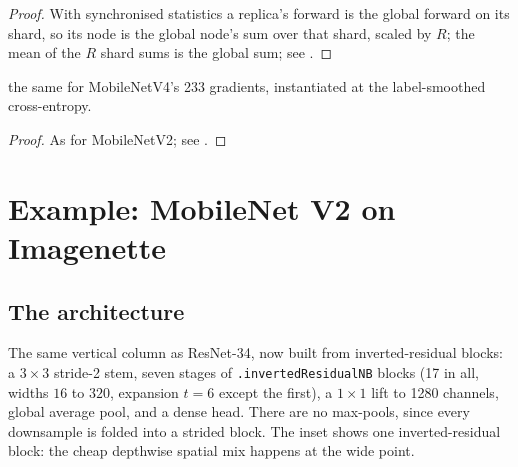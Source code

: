 \begin{proof}
\leanok
With synchronised statistics a replica's forward is the global forward on
its shard, so its node is the global node's sum over that shard, scaled by
\(R\); the mean of the \(R\) shard sums is the global sum; see
.
\end{proof}

\begin{theorem}
  \label{thm:mobilenetv4_sync_tie}
  \leanok
  \Prove{} the same for MobileNetV4's 233 gradients, instantiated at the
  label-smoothed cross-entropy.
\end{theorem}

\begin{proof}
\leanok
As for MobileNetV2; see .
\end{proof}

\section{Example: MobileNet V2 on Imagenette}
\label{sec:depthwise_mnv2_example}

\subsection*{The architecture}

The same vertical column as ResNet-34, now built from
inverted-residual blocks: a $3 \times 3$ stride-2 stem, seven stages of
\texttt{.invertedResidualNB} blocks (17 in all, widths $16$ to $320$,
expansion $t{=}6$ except the first), a $1 \times 1$ lift to 1280
channels, global average pool, and a dense head. There are no
max-pools, since every downsample is folded into a strided block. The
inset shows one inverted-residual block: the cheap depthwise spatial mix
happens at the wide point.

